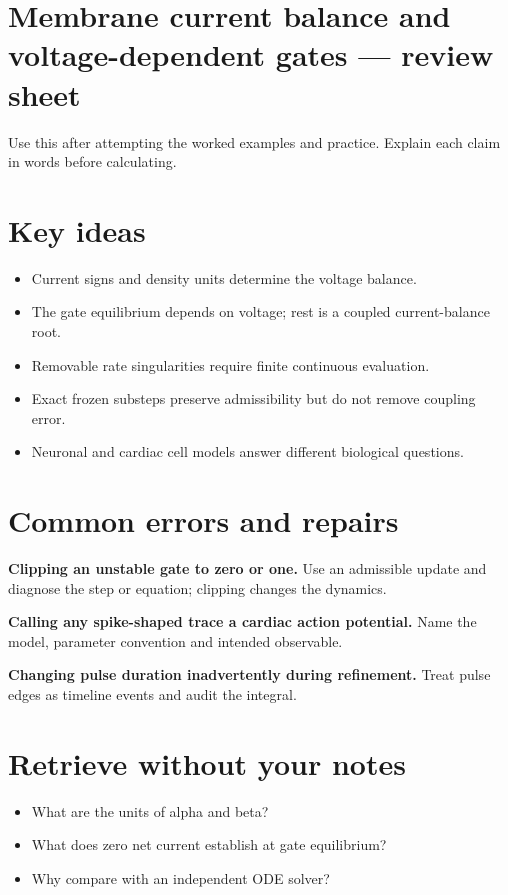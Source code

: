 \documentclass[11pt,letterpaper]{article}
\theoremstyle{definition}\newtheorem{definition}{Definition}\newtheorem{example}{Example}
\numberwithin{equation}{section}
\begin{document}
\section*{Membrane current balance and voltage-dependent gates --- review sheet}
Use this after attempting the worked examples and practice. Explain each claim in words before calculating.

\section*{Key ideas}
\begin{itemize}
\item Current signs and density units determine the voltage balance.
\item The gate equilibrium depends on voltage; rest is a coupled current-balance root.
\item Removable rate singularities require finite continuous evaluation.
\item Exact frozen substeps preserve admissibility but do not remove coupling error.
\item Neuronal and cardiac cell models answer different biological questions.
\end{itemize}
\section*{Common errors and repairs}
\textbf{Clipping an unstable gate to zero or one.} Use an admissible update and diagnose the step or equation; clipping changes the dynamics.

\textbf{Calling any spike-shaped trace a cardiac action potential.} Name the model, parameter convention and intended observable.

\textbf{Changing pulse duration inadvertently during refinement.} Treat pulse edges as timeline events and audit the integral.

\section*{Retrieve without your notes}
\begin{itemize}
\item What are the units of alpha and beta?
\item What does zero net current establish at gate equilibrium?
\item Why compare with an independent ODE solver?
\end{itemize}
\end{document}
